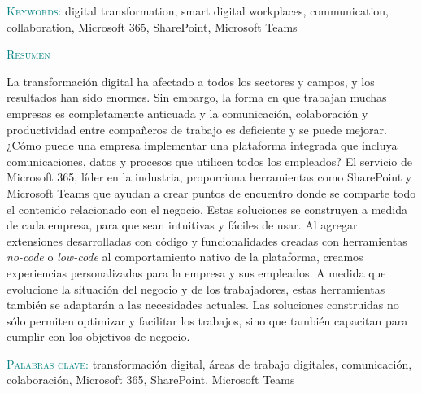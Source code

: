 \textsc{\textcolor{teal}{Keywords:}} digital transformation, smart digital workplaces, communication, collaboration, Microsoft 365, SharePoint, Microsoft Teams

\newpage

\begin{center}
  {\Large \textsc{\textcolor{teal}{Resumen}}}
\end{center}
%
\noindent
%
La transformación digital ha afectado a todos los sectores y campos, y los resultados han sido enormes. Sin embargo, la forma en que trabajan muchas empresas es completamente anticuada y la comunicación, colaboración y productividad entre compañeros de trabajo es deficiente y se puede mejorar. ¿Cómo puede una empresa implementar una plataforma integrada que incluya comunicaciones, datos y procesos que utilicen todos los empleados?
El servicio de Microsoft 365, líder en la industria, proporciona herramientas como SharePoint y Microsoft Teams que ayudan a crear puntos de encuentro donde se comparte todo el contenido relacionado con el negocio. Estas soluciones se construyen a medida de cada empresa, para que sean intuitivas y fáciles de usar. Al agregar extensiones desarrolladas con código y funcionalidades creadas con herramientas \textit{no-code} o \textit{low-code} al comportamiento nativo de la plataforma, creamos experiencias personalizadas para la empresa y sus empleados. A medida que evolucione la situación del negocio y de los trabajadores, estas herramientas también se adaptarán a las necesidades actuales. Las soluciones construidas no sólo permiten optimizar y facilitar los trabajos, sino que también capacitan para cumplir con los objetivos de negocio.

\textsc{\textcolor{teal}{Palabras clave:}} transformación digital, áreas de trabajo digitales, comunicación, colaboración, Microsoft 365, SharePoint, Microsoft Teams
